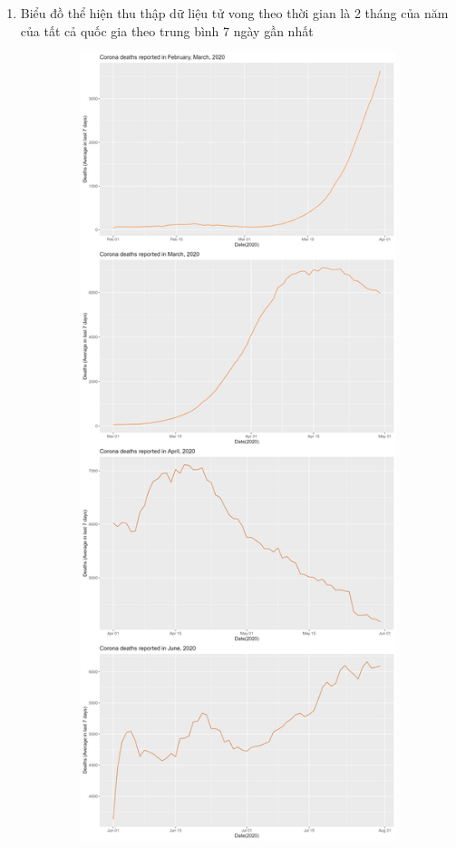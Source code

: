 \documentclass[a4paper]{article}
\theoremstyle{definition}
\begin{document}
\begin{enumerate}[i)]
\begin{enumerate}[1)]
\begin{figure}[H]
			\end{figure}
			\item Biểu đồ thể hiện thu thập dữ liệu tử vong theo thời gian là 2 tháng của năm của tất cả quốc gia theo trung bình 7 ngày gần nhất
			\begin{figure}[H]
				\centering
				\includegraphics[height=23cm,width=13cm]{images/8.4.1.png}
			\end{figure}
			\begin{figure}[H]
				\centering

\end{figure}
\end{enumerate}
\end{enumerate}
\end{document}
